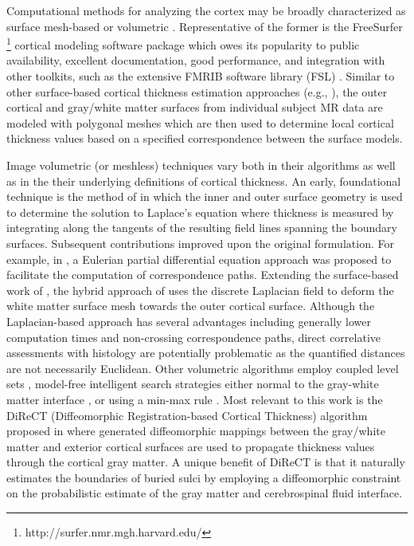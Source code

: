 Computational methods for analyzing the cortex may be 
broadly characterized as surface mesh-based or volumetric \citep{scott2009,clarkson2011}.  Representative of the former is the
FreeSurfer%
\footnote{
http://surfer.nmr.mgh.harvard.edu/
}
cortical modeling software package \citep{dale1999,fischl1999,fischl2000,fischl2002,fischl2004}
which owes its popularity to public availability, excellent documentation, 
good performance, and  integration with other toolkits, such as the extensive FMRIB software 
library (FSL) \citep{smith2004}.  Similar to other surface-based cortical thickness estimation
approaches (e.g., \cite{davatzikos1996,magnotta1999,macdonald2000,kim2005}), the outer cortical
and gray/white matter surfaces from individual subject MR data are modeled with polygonal meshes
which are then used to determine local cortical thickness values based on a specified correspondence between 
the surface models.

Image volumetric (or meshless) techniques vary both in their algorithms as well as
in the their underlying definitions of cortical thickness.  An early, foundational technique is the
method of \cite{jones2000} in which the inner and outer surface geometry is used to determine the
solution to Laplace's equation where thickness is measured by integrating along the 
tangents of the resulting field lines spanning the boundary surfaces.  Subsequent contributions
improved upon the original formulation.  For example, in \cite{yezzi2003}, a Eulerian partial differential equation approach
was proposed to facilitate the computation of correspondence paths.  Extending the surface-based
work of \cite{macdonald2000}, the hybrid approach of
\cite{kim2005} uses the discrete Laplacian field to deform the white matter surface mesh towards the 
outer cortical surface.    Although the Laplacian-based approach has several advantages
including generally lower computation times and
non-crossing correspondence paths, direct correlative assessments with histology
are potentially problematic as the quantified distances 
are not necessarily Euclidean.  Other volumetric algorithms employ coupled
level sets \citep{zeng1999}, model-free intelligent search strategies either normal to 
the gray-white matter interface \citep{scott2009}, or using a min-max rule \citep{clement-vachet2011}.
Most relevant to this work is the DiReCT (Diffeomorphic Registration-based 
Cortical Thickness) algorithm proposed in \cite{das2009} where generated
diffeomorphic mappings between the 
gray/white matter and exterior cortical surfaces are used to propagate thickness values
through the cortical gray matter.  A unique benefit of DiReCT is that it
naturally estimates the boundaries of buried sulci by employing a
diffeomorphic constraint on the probabilistic estimate of the gray
matter and cerebrospinal fluid interface.  

